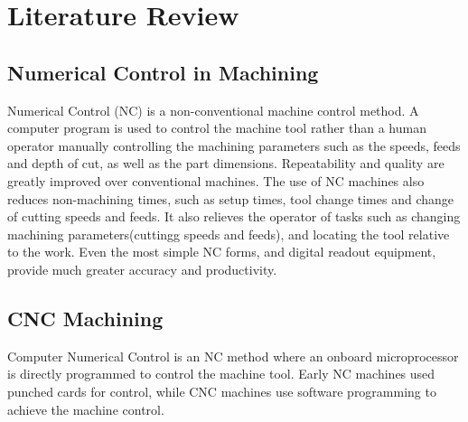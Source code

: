 \section{Literature Review}
\lhead{\leftmark}
\label{sec:review}
\subsection{Numerical Control in Machining}
Numerical Control (NC) is a non-conventional machine control method. A computer program is used to control the machine tool rather than a human operator manually controlling the machining parameters such as the speeds, feeds and depth of cut, as well as the part dimensions. Repeatability and quality are greatly improved over conventional machines. The use of NC machines also reduces non-machining times, such as setup times, tool change times and change of cutting speeds and feeds. It also relieves the operator of tasks such as changing machining parameters(cuttingg speeds and feeds), and locating the tool relative to the work. Even the most simple NC forms, and digital readout equipment, provide much greater accuracy and productivity.
\subsection{CNC Machining}
Computer Numerical Control is an NC method where an onboard microprocessor is directly programmed to control the machine tool. Early NC machines used punched cards for control, while CNC machines use software programming to achieve the machine control.
